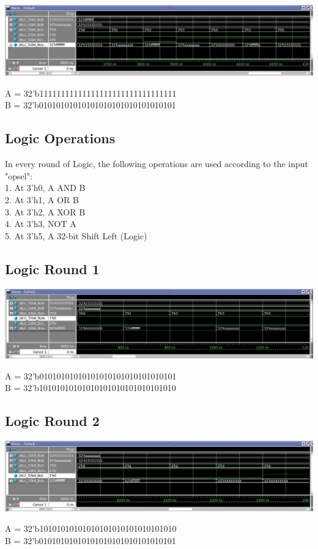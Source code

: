 \documentclass[paper=letter, fontsize=11pt]{scrartcl}
\numberwithin{equation}{section} %
\numberwithin{figure}{section} %
\numberwithin{table}{section} %
\begin{document}
	\centering
			\includegraphics[width=1.0\textwidth]{Art4}
				\label{fig:Art4}
\raggedright A = 32'b11111111111111111111111111111111\\
B = 32'b01010101010101010101010101010101

\subsection{Logic Operations}
\begin{flushleft}
	In every round of Logic, the following operations are used according to the input "opsel": \\ [15pt]
	1. At 3'h0, A AND B\\ 
	2. At 3'h1, A OR B\\
	3. At 3'h2, A XOR B\\
	4. At 3'h3, NOT A\\
	5. At 3'h5, A 32-bit Shift Left (Logic) \\
    
\end{flushleft}

\subsection{Logic Round 1}

	\centering
			\includegraphics[width=1.0\textwidth]{Log1}
				\label{fig:Log1} \\[-15pt]
\raggedright A = 32'b01010101010101010101010101010101\\  
B = 32'b10101010101010101010101010101010

\subsection{Logic Round 2}

	\centering
			\includegraphics[width=1.0\textwidth]{Log2}
				\label{fig:Log2}
\raggedright A = 32'b10101010101010101010101010101010\\ 
 B = 32'b01010101010101010101010101010101
 
\end{document}
